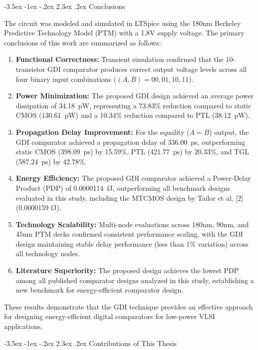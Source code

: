 \documentclass[12pt,a4paper,oneside]{report}
\makeatletter
\renewcommand\section{\@startsection {section}{1}{\z@}%
                                   {-3.5ex \@plus -1ex \@minus -.2ex}%
                                   {2.3ex \@plus.2ex}%
                                   {\normalfont\normalsize\bfseries}}
\makeatother
\begin{document}
\section{Conclusions}

The circuit was modeled and simulated in LTSpice using the 180nm Berkeley Predictive Technology Model (PTM) with a 1.8V supply voltage. The primary conclusions of this work are summarized as follows:

\begin{enumerate}
\item \textbf{Functional Correctness:} Transient simulation confirmed that the 10-transistor GDI comparator produces correct output voltage levels across all four binary input combinations ($(A,B) = 00, 01, 10, 11$).
\item \textbf{Power Minimization:} The proposed GDI design achieved an average power dissipation of 34.18~pW, representing a 73.83\% reduction compared to static CMOS (130.61~pW) and a 10.34\% reduction compared to PTL (38.12~pW).
\item \textbf{Propagation Delay Improvement:} For the equality ($A=B$) output, the GDI comparator achieved a propagation delay of 336.00~ps, outperforming static CMOS (398.09~ps) by 15.59\%, PTL (421.77~ps) by 20.33\%, and TGL (587.24~ps) by 42.78\%.
\item \textbf{Energy Efficiency:} The proposed GDI comparator achieved a Power-Delay Product (PDP) of 0.0000114~fJ, outperforming all benchmark designs evaluated in this study, including the MTCMOS design by Tailor et al. [2] (0.0000159 fJ).
\item \textbf{Technology Scalability:} Multi-node evaluations across 180nm, 90nm, and 45nm PTM decks confirmed consistent performance scaling, with the GDI design maintaining stable delay performance (less than 1\% variation) across all technology nodes.
\item \textbf{Literature Superiority:} The proposed design achieves the lowest PDP among all published comparator designs analyzed in this study, establishing a new benchmark for energy-efficient comparator design.
\end{enumerate}

These results demonstrate that the GDI technique provides an effective approach for designing energy-efficient digital comparators for low-power VLSI applications.

\section{Contributions of This Thesis}
\end{document}

